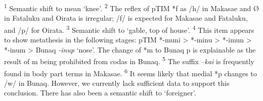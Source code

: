 \textsuperscript{1} Semantic shift to mean `knee'.  \textsuperscript{2} The reflex of pTIM *f as /h/ in Makasae and {\O} in Fataluku and Oirata is irregular; /f/ is expected for Makasae and Fataluku, and /p/ for Oirata.  \textsuperscript{3} Semantic shift to `gable, top of house'.  \textsuperscript{4} This item appears to show metathesis in the following stages: pTIM *-muni {\textgreater} *-minu {\textgreater} *-imun {\textgreater} *-inum {\textgreater} Bunaq \textit{{}-inup} `nose'. The change of *m to Bunaq p is explainable as the result of m being prohibited from codas in Bunaq.  \textsuperscript{5} The suffix --\textit{kai} is frequently found in body part terms in Makasae.  \textsuperscript{6} It seems likely that medial *p changes to /w/ in Bunaq. However, we currently lack sufficient data to support this conclusion. There has also been a semantic shift to `foreigner'.


